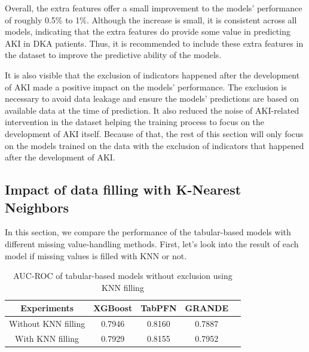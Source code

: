 \documentclass[sn-mathphys-num]{sn-jnl}%
\theoremstyle{thmstyleone}%
\theoremstyle{thmstyletwo}%
\theoremstyle{thmstylethree}%
\begin{document}
Overall, the extra features offer a small improvement to the models' performance of roughly 0.5\% to 1\%.
Although the increase is small, it is consistent across all models, indicating that the extra features do provide some value in predicting AKI in DKA patients.
Thus, it is recommended to include these extra features in the dataset to improve the predictive ability of the models.

It is also visible that the exclusion of indicators happened after the development of AKI made a positive impact on the models' performance.
The exclusion is necessary to avoid data leakage and ensure the models' predictions are based on available data at the time of prediction.
It also reduced the noise of AKI-related intervention in the dataset helping the training process to focus on the development of AKI itself.
Because of that, the rest of this section will only focus on the models trained on the data with the exclusion of indicators that happened after the development of AKI.

\subsection{Impact of data filling with K-Nearest Neighbors}
In this section, we compare the performance of the tabular-based models with different missing value-handling methods.
First, let's look into the result of each model if missing values is filled with KNN or not.

\begin{table}[h!]
    \centering
    \caption{AUC-ROC of tabular-based models without exclusion using KNN filling}
    \label{tab:knn_filling_no_limit}

    \begin{tabular}{|c|c|c|c|c|}
        \hline
        \textbf{Experiments} & \textbf{XGBoost} & \textbf{TabPFN} & 
        \textbf{GRANDE} \\ \hline
        Without KNN filling & 0.7946 & 0.8160 & 0.7887 \\ \hline
        With KNN filling & 0.7929 & 0.8155 & 0.7952 \\ \hline
    \end{tabular}
\end{table}
\end{document}

